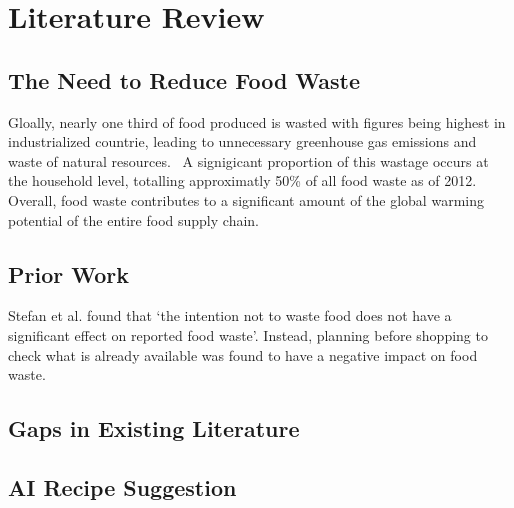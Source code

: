 \section{Literature Review}

\subsection{The Need to Reduce Food Waste}
Gloally, nearly one third of food produced is wasted with figures being highest
in industrialized countrie, leading to unnecessary greenhouse gas emissions and
waste of natural resources.~\cite{gustavsson_global_2011} A signigicant proportion
of this wastage occurs at the household level, totalling approximatly 50\% of all
food waste as of 2012.~\cite{stenmarck_estimates_2016} Overall, food waste contributes
to a significant amount of the global warming potential of the entire food supply
chain.~\cite{scherhaufer_environmental_2018}


\subsection{Prior Work}
Stefan et al. found that \enquote*{the intention not to waste food does not have a
significant effect on reported food waste}. Instead, planning before shopping to
check what is already available was found to have a negative impact on food waste.~\cite{stefan_avoiding_2013}

\subsection{Gaps in Existing Literature}

\subsection{AI Recipe Suggestion}

